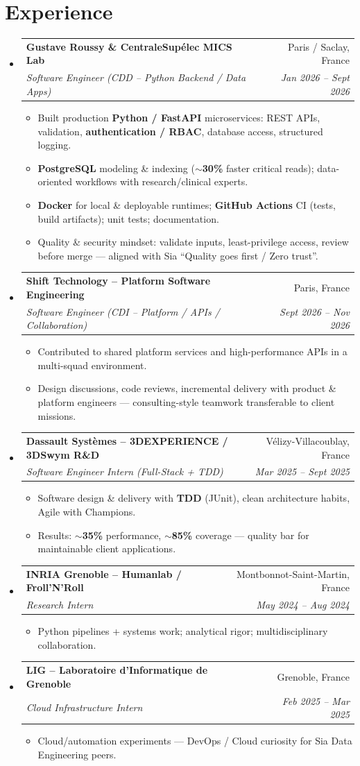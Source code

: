 \documentclass[letterpaper,10.5pt]{article}
\makeatletter
\newcommand{\resumeItem}[1]{\item\small{#1 \vspace{-1.5pt}}}
\newcommand{\resumeSubheading}[4]{\vspace{-1pt}\item\begin{tabular*}{0.97\textwidth}[t]{l@{\extracolsep{\fill}}r}\textbf{#1} & #2 \\\textit{\small#3} & \textit{\small #4} \\\end{tabular*}\vspace{-5pt}}
\newcommand{\resumeSubHeadingListStart}{\begin{itemize}[leftmargin=0.15in, label={}]}
\newcommand{\resumeSubHeadingListEnd}{\end{itemize}}
\newcommand{\resumeItemListStart}{\begin{itemize}[leftmargin=0.18in]}
\newcommand{\resumeItemListEnd}{\end{itemize}\vspace{-3pt}}
\makeatother
\begin{document}
\section{Experience}
\resumeSubHeadingListStart
  \resumeSubheading
    {Gustave Roussy \& CentraleSup\'elec MICS Lab}{Paris / Saclay, France}
    {Software Engineer (CDD -- Python Backend / Data Apps)}{Jan 2026 -- Sept 2026}
    \resumeItemListStart
      \resumeItem{Built production \textbf{Python / FastAPI} microservices: REST APIs, validation, \textbf{authentication / RBAC}, database access, structured logging.}
      \resumeItem{\textbf{PostgreSQL} modeling \& indexing (\textbf{$\sim$30\%} faster critical reads); data-oriented workflows with research/clinical experts.}
      \resumeItem{\textbf{Docker} for local \& deployable runtimes; \textbf{GitHub Actions} CI (tests, build artifacts); unit tests; documentation.}
      \resumeItem{Quality \& security mindset: validate inputs, least-privilege access, review before merge --- aligned with Sia ``Quality goes first / Zero trust''.}
    \resumeItemListEnd
  \resumeSubheading
    {Shift Technology -- Platform Software Engineering}{Paris, France}
    {Software Engineer (CDI -- Platform / APIs / Collaboration)}{Sept 2026 -- Nov 2026}
    \resumeItemListStart
      \resumeItem{Contributed to shared platform services and high-performance APIs in a multi-squad environment.}
      \resumeItem{Design discussions, code reviews, incremental delivery with product \& platform engineers --- consulting-style teamwork transferable to client missions.}
    \resumeItemListEnd
  \resumeSubheading
    {Dassault Syst\`emes -- 3DEXPERIENCE / 3DSwym R\&D}{V\'elizy-Villacoublay, France}
    {Software Engineer Intern (Full-Stack + TDD)}{Mar 2025 -- Sept 2025}
    \resumeItemListStart
      \resumeItem{Software design \& delivery with \textbf{TDD} (JUnit), clean architecture habits, Agile with Champions.}
      \resumeItem{Results: \textbf{$\sim$35\%} performance, \textbf{$\sim$85\%} coverage --- quality bar for maintainable client applications.}
    \resumeItemListEnd
  \resumeSubheading
    {INRIA Grenoble -- Humanlab / Froll'N'Roll}{Montbonnot-Saint-Martin, France}
    {Research Intern}{May 2024 -- Aug 2024}
    \resumeItemListStart
      \resumeItem{Python pipelines + systems work; analytical rigor; multidisciplinary collaboration.}
    \resumeItemListEnd
  \resumeSubheading
    {LIG -- Laboratoire d'Informatique de Grenoble}{Grenoble, France}
    {Cloud Infrastructure Intern}{Feb 2025 -- Mar 2025}
    \resumeItemListStart
      \resumeItem{Cloud/automation experiments --- DevOps / Cloud curiosity for Sia Data Engineering peers.}
    \resumeItemListEnd
\resumeSubHeadingListEnd
\end{document}
